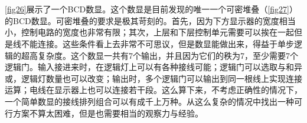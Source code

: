 \begin{figure}[!htp]
\centering
{}\\
\\
\caption{}\label{fig26}
\end{figure}

\autoref{fig26}展示了一个BCD数显。这个数显是目前发现的唯一一个可密堆叠（\autoref{fig27}）的BCD数显。可密堆叠的要求是极其苛刻的。首先，因为下方显示器的宽度相当小，控制电路的宽度也非常有限；其次，上层和下层控制单元需要可以挨在一起但是线不能连接。这些条件看上去非常不可思议，但是数显能做出来，得益于单步逻辑的超高复杂度。这个数显一共有7个输出，并且因为它们的秩为7，至少需要7个逻辑门。输入接进来时，在逻辑灯上可以有各种接线可能；逻辑门可以选取与和异或，逻辑灯数量也可以改变；输出时，多个逻辑门可以输出到同一根线上实现连接运算；电线在显示器上也可以连接若干段。这么算下来，不考虑正确性的情况下，一个简单数显的接线排列组合可以有成千上万种。从这么复杂的情况中找出一种可行方案不算太困难，但是也需要相当的观察力与经验。

